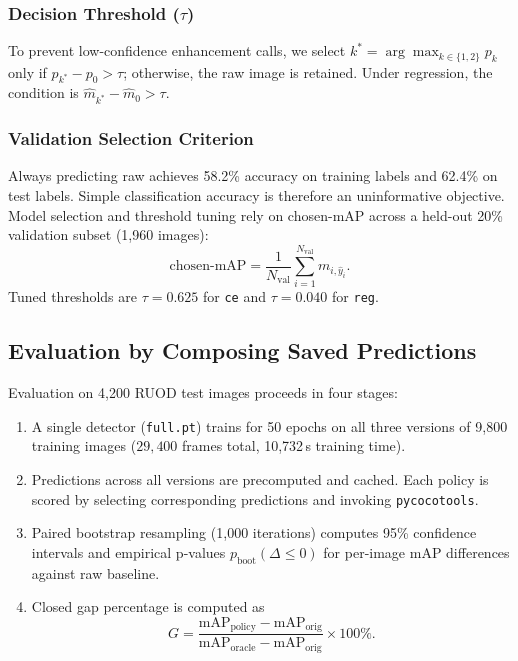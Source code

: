 \documentclass[runningheads]{llncs}
\begin{document}
\subsubsection{Decision Threshold ($\tau$)}
To prevent low-confidence enhancement calls, we select $k^* = \arg\max_{k \in \{1, 2\}} p_k$ only if $p_{k^*} - p_0 > \tau$; otherwise, the raw image is retained. Under regression, the condition is $\hat{m}_{k^*} - \hat{m}_0 > \tau$.

\subsubsection{Validation Selection Criterion}
Always predicting raw achieves 58.2\% accuracy on training labels and 62.4\% on test labels. Simple classification accuracy is therefore an uninformative objective. Model selection and threshold tuning rely on chosen-mAP across a held-out 20\% validation subset (1{,}960 images):
\begin{equation}
    \text{chosen-mAP} = \frac{1}{N_{\mathrm{val}}} \sum_{i=1}^{N_{\mathrm{val}}} m_{i, \hat{y}_i}.
\end{equation}
Tuned thresholds are $\tau = 0.625$ for \texttt{ce} and $\tau = 0.040$ for \texttt{reg}.

\subsection{Evaluation by Composing Saved Predictions}

Evaluation on 4{,}200 RUOD test images proceeds in four stages:
\begin{enumerate}
    \item A single detector (\texttt{full.pt}) trains for 50 epochs on all three versions of 9{,}800 training images ($29{,}400$ frames total, 10{,}732\,s training time).
    \item Predictions across all versions are precomputed and cached. Each policy is scored by selecting corresponding predictions and invoking \texttt{pycocotools}.
    \item Paired bootstrap resampling (1{,}000 iterations) computes 95\% confidence intervals and empirical p-values $p_{\text{boot}}(\Delta \le 0)$ for per-image mAP differences against raw baseline.
    \item Closed gap percentage is computed as
          \begin{equation}
              G = \frac{\mathrm{mAP}_{\mathrm{policy}} - \mathrm{mAP}_{\mathrm{orig}}}{\mathrm{mAP}_{\mathrm{oracle}} - \mathrm{mAP}_{\mathrm{orig}}} \times 100\%.
          \end{equation}
\end{enumerate}
\end{document}
